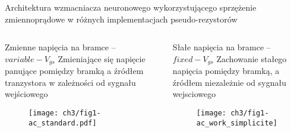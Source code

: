 



\begin{frame}{Architektura wzmacniacza neuronowego wykorzystującego sprzężenie zmiennoprądowe w różnych implementacjach pseudo-rezystorów}
    \begin{columns}[t]

        \vspace{-2em} %

        \begin{alertblock}{Zmienne napięcia na bramce -- $variable-V_{gs}$}
                    Zmieniające się napięcie panujące pomiędzy bramką a źródłem tranzystora w zależności od sygnału wejściowego

            \begin{figure}[H]
                \centering
                \texttt{[image: ch3/fig1-ac\_standard.pdf]}
            \end{figure}
        \end{alertblock}



        \vspace{-2em} %

        \begin{exampleblock}{Słałe napięcia na bramce -- $fixed-V_{gs}$}
                        Zachowanie stałego napięcia pomiędzy bramką, a źródłem niezależnie od sygnału wejsciowego 
            \begin{figure}[H]
                \centering
                \texttt{[image: ch3/fig1-ac\_work\_simplicite]}
            \end{figure}
        \end{exampleblock}

    \end{columns}
\end{frame}

